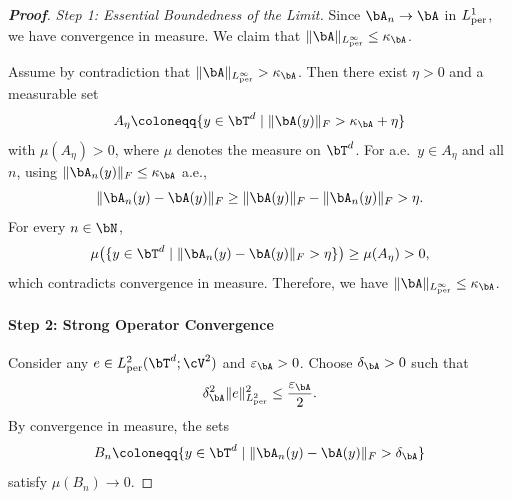 \begin{proof}[\bf Proof]

\textit{Step 1: Essential Boundedness of the Limit.}
Since $\bA_n\to\bA$ in $L^1_{\rm per}$, we have convergence in measure. We claim that
$\|\bA\|_{L^\infty_{\rm per}}\le \kappa_{\bA}$.

Assume by contradiction that $\|\bA\|_{L^\infty_{\rm per}}>\kappa_{\bA}$. Then there exist $\eta>0$ and a measurable set
\begin{equation*}
A_\eta\coloneqq\{y\in\bT^d\mid \|\bA(y)\|_F>\kappa_{\bA}+\eta\}
\end{equation*}
with $\mu(A_\eta)>0$, where $\mu$ denotes the measure on $\bT^d$. For a.e.\ $y\in A_\eta$ and all $n$, using $\|\bA_n(y)\|_F\le \kappa_{\bA}$ a.e.,
\begin{equation*}
    \|\bA_n(y)-\bA(y)\|_F\ge \|\bA(y)\|_F-\|\bA_n(y)\|_F>\eta.
\end{equation*}
For every $n\in\bN$,
\begin{equation*}
    \mu\bigl(\{y\in\bT^d\mid \|\bA_n(y)-\bA(y)\|_F>\eta\}\bigr)\ge \mu(A_\eta)>0,
\end{equation*}
which contradicts convergence in measure. Therefore, we have $\|\bA\|_{L^\infty_{\rm per}}\le \kappa_{\bA}$.

\paragraph{Step 2: Strong Operator Convergence}
Consider any $e\in L^2_{\rm per}(\bT^d;\cV^{2})$ and $\varepsilon_{\bA}>0$. Choose $\delta_{\bA}>0$ such that
\begin{equation*}
    \delta_{\bA}^2\|e\|_{L^2_{\rm per}}^2\le \frac{\varepsilon_{\bA}}{2}.
\end{equation*}
By convergence in measure, the sets
\begin{equation*}
    B_n\coloneqq\{y\in\bT^d\mid \|\bA_n(y)-\bA(y)\|_F>\delta_{\bA}\}
\end{equation*}
satisfy $\mu(B_n)\to0$.


\end{proof}
